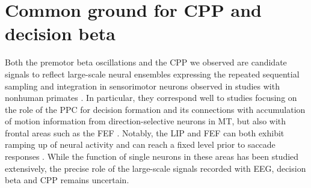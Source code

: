 \section{Common ground for CPP and decision beta}
Both the premotor beta oscillations and the CPP we observed are candidate signals to reflect large-scale neural ensembles expressing the repeated sequential sampling and integration in sensorimotor neurons observed in studies with nonhuman primates \parencite{Gold2007,Hanks2017,Kelly2015,Spitzer2017}. In particular, they correspond well to studies focusing on the role of the PPC for decision formation and its connections with accumulation of motion information from direction-selective neurons in MT, but also with frontal areas such as the FEF \parencite{Ding2012}. Notably, the LIP and FEF can both exhibit ramping up of neural activity and can reach a fixed level prior to saccade responses \parencite{Ding2010,Ding2012,Hanes1996,Roitman2002}. While the function of single neurons in these areas has been studied extensively, the precise role of the large-scale signals recorded with EEG, decision beta and CPP remains uncertain.
